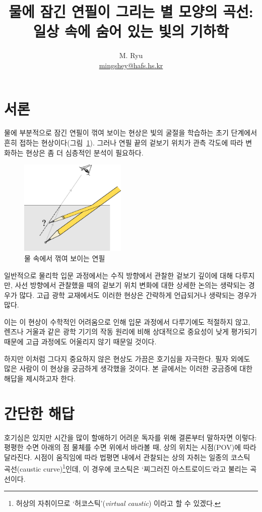 \documentclass[twocolumn]{article}
\title{물에 잠긴 연필이 그리는 별 모양의 곡선:\\ 일상 속에 숨어 있는 빛의 기하학}
\author{M. Ryu \\ {\href{mailto:mingshey@hafs.hs.kr}{mingshey@hafs.hs.kr}}}
\begin{document}
\maketitle

\renewcommand{\figurename}{그림}
\section{서론}

물에 부분적으로 잠긴 연필이 꺾여 보이는 현상은 빛의 굴절을 학습하는 초기 단계에서 흔히 접하는 현상이다(\figurename\ \ref{fig:pencil}). 그러나 연필 끝의 겉보기 위치가 관측 각도에 따라 변화하는 현상은 좀 더 심층적인 분석이 필요하다. 

\begin{figure}[ht]
	\centering
	\includegraphics[width=2in]{figs/g164.eps}
	\caption{물 속에서 꺾여 보이는 연필}
	\label{fig:pencil}
\end{figure}

일반적으로 물리학 입문 과정에서는 수직 방향에서 관찰한 겉보기 깊이에 대해 다루지만, 사선 방향에서 관찰했을 때의 겉보기 위치 변화에 대한 상세한 논의는 생략되는 경우가 많다. 고급 광학 교재에서도 이러한 현상은 간략하게 언급되거나 생략되는 경우가 많다. 

이는 이 현상이 수학적인 어려움으로 인해 입문 과정에서 다루기에도 적절하지 않고, 렌즈나 거울과 같은 광학 기기의 작동 원리에 비해 상대적으로 중요성이 낮게 평가되기 때문에 고급 과정에도 어울리지 않기 때문일 것이다. 

하지만 이처럼 그다지 중요하지 않은 현상도 가끔은 호기심을 자극한다. 필자 외에도 많은 사람이 이 현상을 궁금하게 생각했을 것이다. 본 글에서는 이러한 궁금증에 대한 해답을 제시하고자 한다.


\section{간단한 해답}

호기심은 있지만 시간을 많이 할애하기 어려운 독자를 위해 결론부터 말하자면 이렇다:  
평평한 수면 아래의 점 물체를 수면 위에서 바라볼 때, 상의 위치는 시점(POV)에 따라 달라진다. 
시점이 움직임에 따라 법평면 내에서 관찰되는 상의 자취는 일종의  코스틱 곡선(caustic curve)\footnote{허상의 
자취이므로 `허코스틱'(\emph{virtual caustic}) 이라고 할 수 있겠다.}인데, 이 경우에 
코스틱은 `찌그러진 아스트로이드'라고 불리는 곡선이다.
	
\end{document}
